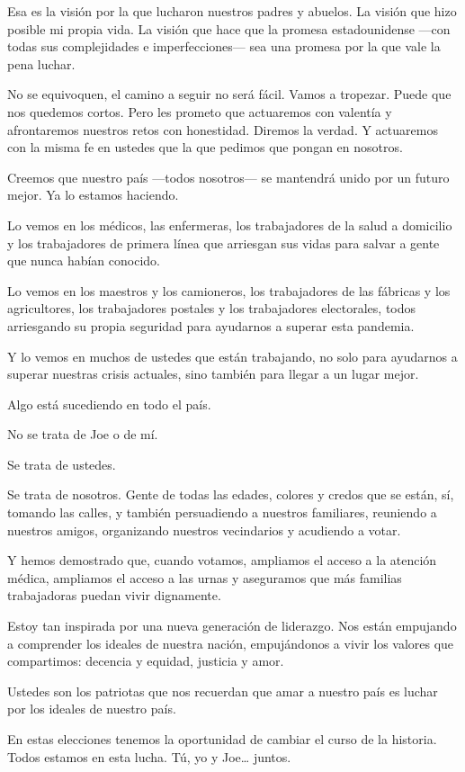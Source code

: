 Esa es la visión por la que lucharon nuestros padres y abuelos. La
visión que hizo posible mi propia vida. La visión que hace que la
promesa estadounidense ---con todas sus complejidades e
imperfecciones--- sea una promesa por la que vale la pena luchar.

No se equivoquen, el camino a seguir no será fácil. Vamos a tropezar.
Puede que nos quedemos cortos. Pero les prometo que actuaremos con
valentía y afrontaremos nuestros retos con honestidad. Diremos la
verdad. Y actuaremos con la misma fe en ustedes que la que pedimos que
pongan en nosotros.

Creemos que nuestro país ---todos nosotros--- se mantendrá unido por un
futuro mejor. Ya lo estamos haciendo.

Lo vemos en los médicos, las enfermeras, los trabajadores de la salud a
domicilio y los trabajadores de primera línea que arriesgan sus vidas
para salvar a gente que nunca habían conocido.

Lo vemos en los maestros y los camioneros, los trabajadores de las
fábricas y los agricultores, los trabajadores postales y los
trabajadores electorales, todos arriesgando su propia seguridad para
ayudarnos a superar esta pandemia.

Y lo vemos en muchos de ustedes que están trabajando, no solo para
ayudarnos a superar nuestras crisis actuales, sino también para llegar a
un lugar mejor.

Algo está sucediendo en todo el país.

No se trata de Joe o de mí.

Se trata de ustedes.

Se trata de nosotros. Gente de todas las edades, colores y credos que se
están, sí, tomando las calles, y también persuadiendo a nuestros
familiares, reuniendo a nuestros amigos, organizando nuestros
vecindarios y acudiendo a votar.

Y hemos demostrado que, cuando votamos, ampliamos el acceso a la
atención médica, ampliamos el acceso a las urnas y aseguramos que más
familias trabajadoras puedan vivir dignamente.

Estoy tan inspirada por una nueva generación de liderazgo. Nos están
empujando a comprender los ideales de nuestra nación, empujándonos a
vivir los valores que compartimos: decencia y equidad, justicia y amor.

Ustedes son los patriotas que nos recuerdan que amar a nuestro país es
luchar por los ideales de nuestro país.

En estas elecciones tenemos la oportunidad de cambiar el curso de la
historia. Todos estamos en esta lucha. Tú, yo y Joe\ldots{} juntos.

